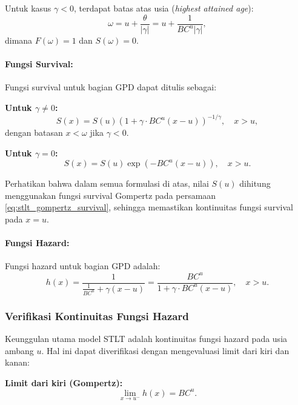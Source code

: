 Untuk kasus $\gamma < 0$, terdapat batas atas usia (\textit{highest attained age}):
\begin{equation}
\omega = u + \frac{\theta}{|\gamma|} = u + \frac{1}{BC^u|\gamma|},
\label{eq:stlt_omega}
\end{equation}
dimana $F(\omega) = 1$ dan $S(\omega) = 0$.

\paragraph{Fungsi Survival:}

Fungsi survival untuk bagian GPD dapat ditulis sebagai:

\textbf{Untuk $\gamma \neq 0$:}
\begin{equation}
S(x) = S(u) \left(1 + \gamma \cdot BC^u(x-u)\right)^{-1/\gamma}, \quad x > u,
\label{eq:stlt_gpd_survival_general}
\end{equation}
dengan batasan $x < \omega$ jika $\gamma < 0$.

\textbf{Untuk $\gamma = 0$:}
\begin{equation}
S(x) = S(u) \exp\left(-BC^u(x-u)\right), \quad x > u.
\label{eq:stlt_gpd_survival_zero}
\end{equation}

Perhatikan bahwa dalam semua formulasi di atas, nilai $S(u)$ dihitung menggunakan fungsi survival Gompertz pada persamaan \eqref{eq:stlt_gompertz_survival}, sehingga memastikan kontinuitas fungsi survival pada $x = u$.

\paragraph{Fungsi Hazard:}

Fungsi hazard untuk bagian GPD adalah:
\begin{equation}
h(x) = \frac{1}{\frac{1}{BC^u} + \gamma(x-u)} = \frac{BC^u}{1 + \gamma \cdot BC^u(x-u)}, \quad x > u.
\label{eq:stlt_gpd_hazard}
\end{equation}

\subsubsection{Verifikasi Kontinuitas Fungsi Hazard}

Keunggulan utama model STLT adalah kontinuitas fungsi hazard pada usia ambang $u$. Hal ini dapat diverifikasi dengan mengevaluasi limit dari kiri dan kanan:

\textbf{Limit dari kiri (Gompertz):}
\begin{equation}
\lim_{x \to u^-} h(x) = BC^u.
\label{eq:hazard_left_limit}
\end{equation}

